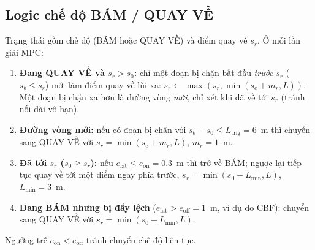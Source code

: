 \documentclass[11pt,a4paper]{article}
\numberwithin{equation}{section}
\theoremstyle{definition}
\theoremstyle{plain}
\theoremstyle{remark}
\begin{document}
\subsection{Logic chế độ BÁM / QUAY VỀ}
Trạng thái gồm chế độ (BÁM hoặc QUAY VỀ) và điểm quay về $s_r$. Ở mỗi lần giải MPC:
\begin{enumerate}
\item \textbf{Đang QUAY VỀ và $s_r>s_0$:} chỉ một đoạn bị chặn bắt đầu \emph{trước} $s_r$ ($s_b\le s_r$) mới làm điểm quay về lùi xa: $s_r\leftarrow\max(s_r,\min(s_e+m_r,L))$. Một đoạn bị chặn xa hơn là đường vòng \emph{mới}, chỉ xét khi đã về tới $s_r$ (tránh nối dài vô hạn).
\item \textbf{Đường vòng mới:} nếu có đoạn bị chặn với $s_b-s_0\le L_{\text{trig}}=6$~m thì chuyển sang QUAY VỀ với $s_r=\min(s_e+m_r,L)$, $m_r=1$~m.
\item \textbf{Đã tới $s_r$ ($s_0\ge s_r$):} nếu $e_{\text{lat}}\le e_{\text{on}}=0.3$~m thì trở về BÁM; ngược lại tiếp tục quay về tới một điểm ngay phía trước, $s_r=\min(s_0+L_{\min},L)$, $L_{\min}=3$~m.
\item \textbf{Đang BÁM nhưng bị đẩy lệch} ($e_{\text{lat}}>e_{\text{off}}=1$~m, ví dụ do CBF): chuyển sang QUAY VỀ với $s_r=\min(s_0+L_{\min},L)$.
\end{enumerate}
Ngưỡng trễ $e_{\text{on}}<e_{\text{off}}$ tránh chuyển chế độ liên tục.
\end{document}
